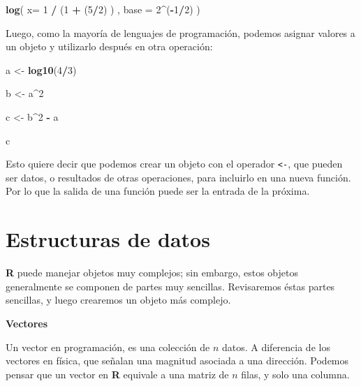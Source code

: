 \documentclass[12pt,letterpaper,]{book}
\newenvironment{Shaded}{\begin{snugshade}}{\end{snugshade}}
\newcommand{\KeywordTok}[1]{\textcolor[rgb]{0.13,0.29,0.53}{\textbf{#1}}}
\newcommand{\DataTypeTok}[1]{\textcolor[rgb]{0.13,0.29,0.53}{#1}}
\newcommand{\DecValTok}[1]{\textcolor[rgb]{0.00,0.00,0.81}{#1}}
\newcommand{\StringTok}[1]{\textcolor[rgb]{0.31,0.60,0.02}{#1}}
\newcommand{\OperatorTok}[1]{\textcolor[rgb]{0.81,0.36,0.00}{\textbf{#1}}}
\newcommand{\NormalTok}[1]{#1}
\begin{document}
\begin{Shaded}
\begin{Highlighting}[]
\KeywordTok{log}\NormalTok{( }\DataTypeTok{x=} \DecValTok{1} \OperatorTok{/}\StringTok{ }\NormalTok{(}\DecValTok{1} \OperatorTok{+}\StringTok{ }\NormalTok{(}\DecValTok{5}\OperatorTok{/}\DecValTok{2}\NormalTok{) ) , }\DataTypeTok{base =} \DecValTok{2}\OperatorTok{^}\NormalTok{(}\OperatorTok{-}\DecValTok{1}\OperatorTok{/}\DecValTok{2}\NormalTok{) )}
\end{Highlighting}
\end{Shaded}

Luego, como la mayoría de lenguajes de programación, podemos asignar
valores a un objeto y utilizarlo después en otra operación:

\begin{Shaded}
\begin{Highlighting}[]
\NormalTok{a <-}\StringTok{ }\KeywordTok{log10}\NormalTok{(}\DecValTok{4}\OperatorTok{/}\DecValTok{3}\NormalTok{)}

\NormalTok{b <-}\StringTok{ }\NormalTok{a}\OperatorTok{^}\DecValTok{2}

\NormalTok{c <-}\StringTok{ }\NormalTok{b}\OperatorTok{^}\DecValTok{2} \OperatorTok{-}\StringTok{ }\NormalTok{a}

\NormalTok{c}
\end{Highlighting}
\end{Shaded}

Esto quiere decir que podemos crear un objeto con el operador
\texttt{\textless{}-}, que pueden ser datos, o resultados de otras
operaciones, para incluirlo en una nueva función. Por lo que la salida
de una función puede ser la entrada de la próxima.

\section{Estructuras de datos}\label{estructuras-de-datos}

\textbf{R} puede manejar objetos muy complejos; sin embargo, estos
objetos generalmente se componen de partes muy sencillas. Revisaremos
éstas partes sencillas, y luego crearemos un objeto más complejo.

\textbf{Vectores}

Un vector en programación, es una colección de \(n\) datos. A diferencia
de los vectores en física, que señalan una magnitud asociada a una
dirección. Podemos pensar que un vector en \textbf{R} equivale a una
matriz de \(n\) filas, y solo una columna.
\end{document}

